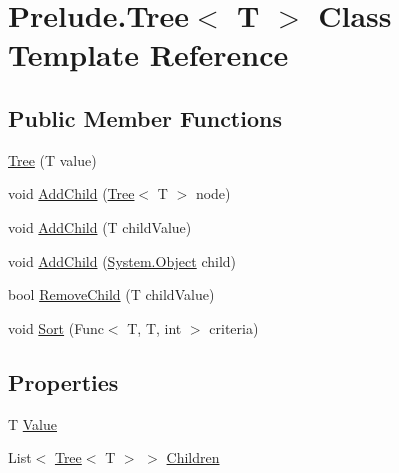 \hypertarget{class_prelude_1_1_tree_3_01_t_01_4}{\section{Prelude.\+Tree$<$ T $>$ Class Template Reference}
\label{class_prelude_1_1_tree_3_01_t_01_4}
}
\subsection*{Public Member Functions}
\begin{DoxyCompactItemize}
\item 
\hyperlink{class_prelude_1_1_tree_3_01_t_01_4_a40281466228fd208a9f124f647ba4d1f}{Tree} (T value)
\item 
void \hyperlink{class_prelude_1_1_tree_3_01_t_01_4_abda28a10f76801b227e48daacda3f4fa}{Add\+Child} (\hyperlink{class_prelude_1_1_tree_3_01_t_01_4_a40281466228fd208a9f124f647ba4d1f}{Tree}$<$ T $>$ node)
\item 
void \hyperlink{class_prelude_1_1_tree_3_01_t_01_4_a92de3a4f0d725e6b1f2cb0d3b74bff60}{Add\+Child} (T child\+Value)
\item 
void \hyperlink{class_prelude_1_1_tree_3_01_t_01_4_a0440b7a7f7cb0250b047fd68dfb7685c}{Add\+Child} (\hyperlink{i_c_s___logic_8cs_a5b2c8b05b9a357906d7f9e5b2c1e154d}{System.\+Object} child)
\item 
bool \hyperlink{class_prelude_1_1_tree_3_01_t_01_4_a13ae81974e458d86cb53a3431e2afba6}{Remove\+Child} (T child\+Value)
\item 
void \hyperlink{class_prelude_1_1_tree_3_01_t_01_4_a82a67b0cdf78e14dca643231563aa6f7}{Sort} (Func$<$ T, T, int $>$ criteria)
\end{DoxyCompactItemize}
\subsection*{Properties}
\begin{DoxyCompactItemize}
\item 
T \hyperlink{class_prelude_1_1_tree_3_01_t_01_4_a9ca654dad394413776f0cf7727443c8c}{Value}
\item 
List$<$ \hyperlink{class_prelude_1_1_tree_3_01_t_01_4_a40281466228fd208a9f124f647ba4d1f}{Tree}$<$ T $>$ $>$ \hyperlink{class_prelude_1_1_tree_3_01_t_01_4_af6a331872b6c92f0c4bfed329f3b779d}{Children}
\end{DoxyCompactItemize}


